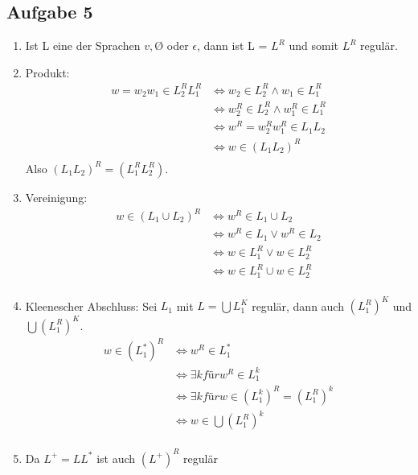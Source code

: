 \subsection*{Aufgabe 5}
\begin{enumerate}
  \item Ist L eine der Sprachen ${v}, Ø$ oder ${\epsilon}$, dann ist L = $L^R$ und somit $L^R$ regulär.
  \item Produkt:
  \begin{align*}
    w = w_2w_1 \in L_2^R L_1^R &\iff w_2 \in L_2^R \land w_1 \in L_1^R \\
    &\iff w_2^R \in L_2^R \land w_1^R \in L_1^R \\
    &\iff w^R = w_2^R w_1^R \in L_1 L_2 \\
    &\iff w \in (L_1 L_2)^R \\
  \end{align*}
  Also $(L_1 L_2)^R = (L_1^R L_2^R)$.

  \item Vereinigung:
  \begin{align*}
    w \in (L_1 \cup L_2)^R &\iff w^R \in L_1 \cup L_2 \\
    &\iff w^R \in L_1 \lor w^R \in L_2  \\
    &\iff w \in L_1^R \lor w \in L_2^R \\
    &\iff w \in L_1^R \cup w \in L_2^R \\
  \end{align*}


  \item Kleenescher Abschluss:
  Sei $L_1$ mit $L=\bigcup L_1^K$ regulär, dann auch $(L_1^R)^K$ und $\bigcup (L_1^R)^K$.
  \begin{align*}
    w \in (L_1^*)^R &\iff w^R \in L_1^* \\
    &\iff \exists k für w^R \in L_1^k \\
    &\iff \exists k für w \in (L_1^k)^R = (L_1^R)^k \\
    &\iff w \in \bigcup (L_1^R)^k \\
  \end{align*}

  \item Da $L^+ = LL^*$ ist auch $(L^+)^R$ regulär



\end{enumerate}
